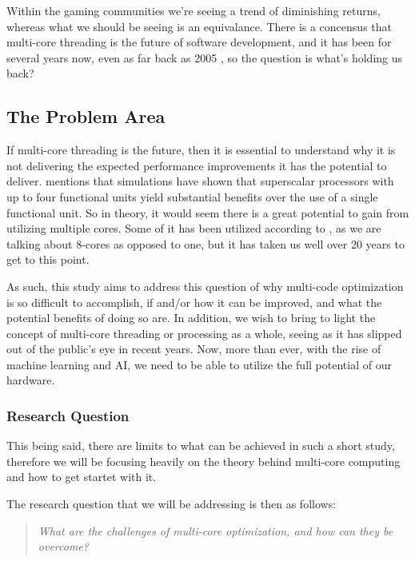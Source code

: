 \documentclass{article}
\begin{document}
Within the gaming communities we're seeing a trend of diminishing returns, whereas what we should be seeing is an equivalance. There is a concensus that multi-core threading is the future of software development, and it has been for several years now, even as far back as 2005 \parencite{mscodes}, so the question is what's holding us back?

\subsection{The Problem Area}

If multi-core threading is the future, then it is essential to understand why it is not delivering the expected performance improvements it has the potential to deliver. \parencite[p. 12]{Rauber2023} mentions that simulations have shown that superscalar processors with up to four functional units yield substantial benefits over the use of a single functional unit. So in theory, it would seem there is a great potential to gain from utilizing multiple cores. Some of it has been utilized according to \textcite{Thomas2025}, as we are talking about 8-cores as opposed to one, but it has taken us well over 20 years to get to this point.

As such, this study aims to address this question of why multi-code optimization is so difficult to accomplish, if and/or how it can be improved, and what the potential benefits of doing so are. In addition, we wish to bring to light the concept of multi-core threading or processing as a whole, seeing as it has slipped out of the public's eye in recent years. Now, more than ever, with the rise of machine learning and AI, we need to be able to utilize the full potential of our hardware.

\subsubsection{Research Question}

This being said, there are limits to what can be achieved in such a short study, therefore we will be focusing heavily on the theory behind multi-core computing and how to get startet with it. 

The research question that we will be addressing is then as follows:

\begin{quote}
    \textit{What are the challenges of multi-core optimization, and how can they be overcome?}
\end{quote}
\end{document}
